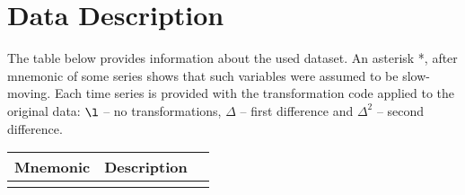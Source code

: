 \documentclass[a4paper, 14pt]{article}
\begin{document}
\section{Data Description}
The table below provides information about the used dataset. An asterisk *, after mnemonic of some series shows that such variables were assumed to be slow-moving. Each time series is provided with the transformation code applied to the original data: $\l$ -- no transformations, $\Delta$ -- first difference and $\Delta^2$ -- second difference. 
\begin{center}
	\begin{longtable}{p{5.5cm} p{10cm} p{0.15cm}}
		
		\hline \hline \multicolumn{1}{c}{\textbf{Mnemonic}} & \multicolumn{1}{c}{\textbf{Description}} & \multicolumn{1}{c}{\textbf{}} \\ \hline 
		\endfirsthead
		
		
	
		\endhead
		
		
		\endfoot
		
		\hline \hline
		\endlastfoot
		

\end{longtable}
\end{center}
\end{document}
